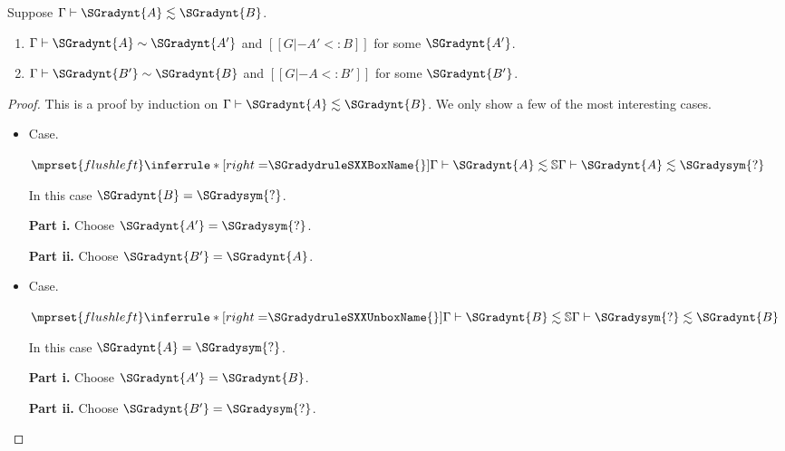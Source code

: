 \begin{lemma}
  \label{lemma:consistent-subtyping-1}
  Suppose $ \Gamma  \vdash  \SGradynt{A}  \lesssim  \SGradynt{B} $.
  \begin{enumerate}[label=\roman*., align=left]
  \item $ \Gamma  \vdash  \SGradynt{A}  \sim  \SGradynt{A'} $ and $[[G |- A' <: B]]$ for some $\SGradynt{A'}$.
  \item $ \Gamma  \vdash  \SGradynt{B'}  \sim  \SGradynt{B} $ and $[[G |- A <: B']]$ for some $\SGradynt{B'}$.
  \end{enumerate}
\end{lemma}
\begin{proof}
  This is a proof by induction on $ \Gamma  \vdash  \SGradynt{A}  \lesssim  \SGradynt{B} $.  We only show a
  few of the most interesting cases.
  \begin{itemize}
  \item[] Case.\ \\ 
    \begin{center}
      \begin{math}
        $$\mprset{flushleft}
        \inferrule* [right=$\SGradydruleSXXBoxName{}$] {
           \Gamma  \vdash  \SGradynt{A}  \lesssim   \mathbb{S}  
        }{ \Gamma  \vdash  \SGradynt{A}  \lesssim  \SGradysym{\mbox{?}} }
      \end{math}
    \end{center}
    In this case $\SGradynt{B} = \SGradysym{\mbox{?}}$.

    \noindent
    \textbf{Part i.} Choose $\SGradynt{A'} = \SGradysym{\mbox{?}}$.

    \noindent
    \textbf{Part ii.} Choose $\SGradynt{B'} = \SGradynt{A}$.

  \item[] Case.\ \\ 
    \begin{center}
      \begin{math}
        $$\mprset{flushleft}
        \inferrule* [right=$\SGradydruleSXXUnboxName{}$] {
           \Gamma  \vdash  \SGradynt{B}  \lesssim   \mathbb{S}  
        }{ \Gamma  \vdash  \SGradysym{\mbox{?}}  \lesssim  \SGradynt{B} }
      \end{math}
    \end{center}
    In this case $\SGradynt{A} = \SGradysym{\mbox{?}}$.

    \noindent
    \textbf{Part i.} Choose $\SGradynt{A'} = \SGradynt{B}$.

    \noindent
    \textbf{Part ii.} Choose $\SGradynt{B'} = \SGradysym{\mbox{?}}$.


\end{itemize}
\end{proof}
